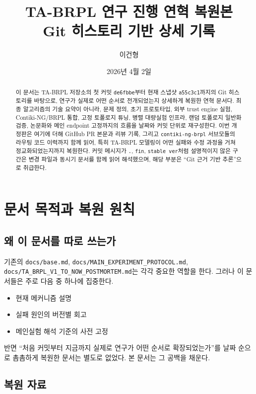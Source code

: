 \documentclass[12pt,a4paper]{article}
\title{\textbf{TA-BRPL 연구 진행 연혁 복원본}\\
\large Git 히스토리 기반 상세 기록}
\author{이건형}
\date{2026년 4월 2일}
\begin{document}
\maketitle
\thispagestyle{empty}

\begin{abstract}
이 문서는 TA-BRPL 저장소의 첫 커밋 \texttt{de6fbbe}부터 현재 스냅샷
\texttt{a55c3c1}까지의 Git 히스토리를 바탕으로, 연구가 실제로 어떤 순서로
전개되었는지 상세하게 복원한 연혁 문서다. 최종 알고리즘의 기술 요약이 아니라,
문제 정의, 초기 프로토타입, 외부 trust engine 실험, Contiki-NG/BRPL 통합,
고정 토폴로지 튜닝, 병렬 대량실험 인프라, 랜덤 토폴로지 일반화 검증,
논문화와 메인 endpoint 고정까지의 흐름을 날짜와 커밋 단위로 재구성한다.
이번 개정판은 여기에 더해 GitHub PR 본문과 리뷰 기록, 그리고
\texttt{contiki-ng-brpl} 서브모듈의 라우팅 코드 이력까지 함께 읽어,
특히 TA-BRPL 모델링이 어떤 실패와 수정 과정을 거쳐 정교화되었는지까지
복원한다.
커밋 메시지가 \texttt{.}, \texttt{fin}, \texttt{stable ver}처럼 설명적이지 않은
구간은 변경 파일과 동시기 문서를 함께 읽어 해석했으며, 해당 부분은
``Git 근거 기반 추론''으로 취급한다.
\end{abstract}

\tableofcontents
\clearpage

\section{문서 목적과 복원 원칙}

\subsection{왜 이 문서를 따로 쓰는가}

기존의 \texttt{docs/base.md}, \texttt{docs/MAIN\_EXPERIMENT\_PROTOCOL.md},
\texttt{docs/TA\_BRPL\_V1\_TO\_NOW\_POSTMORTEM.md}는 각각 중요한 역할을 한다.
그러나 이 문서들은 주로 다음 중 하나에 집중한다.

\begin{itemize}[leftmargin=1.5em]
\item 현재 메커니즘 설명
\item 실패 원인의 버전별 회고
\item 메인실험 해석 기준의 사전 고정
\end{itemize}

반면 ``처음 커밋부터 지금까지 실제로 연구가 어떤 순서로 확장되었는가''를
날짜 순으로 촘촘하게 복원한 문서는 별도로 없었다. 본 문서는 그 공백을 채운다.

\subsection{복원 자료}
\end{document}
